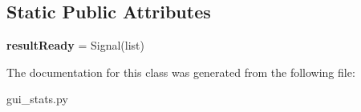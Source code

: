 \subsection*{Static Public Attributes}
\begin{DoxyCompactItemize}
\item 
\mbox{\label{classgui__stats_1_1_postproc_thread_a5d6c202489dfa8399033bbde37b944ef}} 
{\bfseries result\+Ready} = Signal(list)
\end{DoxyCompactItemize}


The documentation for this class was generated from the following file\+:\begin{DoxyCompactItemize}
\item 
gui\+\_\+stats.\+py\end{DoxyCompactItemize}
